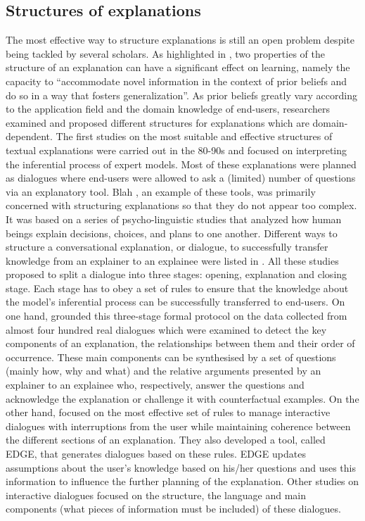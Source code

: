 \documentclass[final,1p,times]{elsarticle}
\begin{document}
\subsection{Structures of explanations}\label{explnation_structure}
The most effective way to structure explanations is still an open problem despite being tackled by several scholars. As highlighted in \cite{lombrozo2006structure}, two properties of the structure of an explanation can have a significant effect on learning, namely the capacity to ``accommodate novel information in the context of prior beliefs and do so in a way that fosters generalization''. 
As prior beliefs greatly vary according to the application field and the domain knowledge of end-users, researchers examined and proposed different structures for explanations which are domain-dependent.
The first studies on the most suitable and effective structures of textual explanations were carried out in the 80-90s and focused on interpreting the inferential process of expert models. Most of these explanations were planned as dialogues where end-users were allowed to ask a (limited) number of questions via an explanatory tool. Blah \cite{weiner1980blah}, an example of these tools, was primarily concerned with structuring explanations so that they do not appear too complex. It was based on a series of psycho-linguistic studies that analyzed how human beings explain decisions, choices, and plans to one another. 
Different ways to structure a conversational explanation, or dialogue, to successfully transfer knowledge from an explainer to an explainee were listed in \cite{walton2011dialogue, cawsey1991generating, cawsey1993planning,cawsey1993user, madumal2019grounded}. All these studies proposed to split a dialogue into three stages: opening, explanation and closing stage. Each stage has to obey a set of rules to ensure that the knowledge about the model's inferential process can be successfully transferred to end-users. On one hand, \cite{madumal2019grounded} grounded this three-stage formal protocol on the data collected from almost four hundred real dialogues which were examined to detect the key components of an explanation, the relationships between them and their order of occurrence. These main components can be synthesised by a set of questions (mainly how, why and what) and the relative arguments presented by an explainer to an explainee who, respectively, answer the questions and acknowledge the explanation or challenge it with counterfactual examples. 
On the other hand, \cite{cawsey1991generating, cawsey1993planning,cawsey1993user} focused on the most effective set of rules to manage interactive dialogues with interruptions from the user while maintaining coherence between the different sections of an explanation. They also developed a tool, called EDGE, that generates dialogues based on these rules. EDGE updates assumptions about the user's knowledge based on his/her questions and uses this information to influence the further planning of the explanation. Other studies on interactive dialogues \cite{pollack1982user,johnson1993explanation, moore1989planning, moore1989reactive, moore1991reactive} focused on the structure, the language and main components (what pieces of information must be included) of these dialogues.
\end{document}
